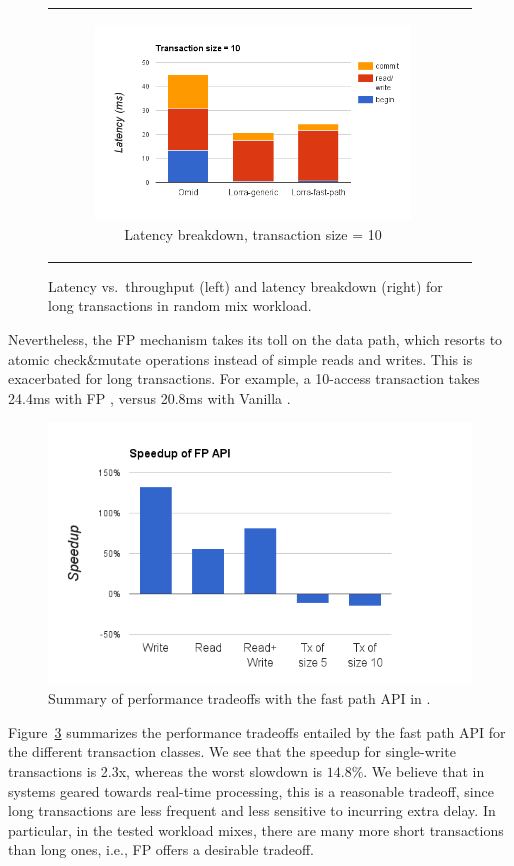 \begin{figure}[t]
\begin{tabular}{cc}
  \begin{subfigure}[t]{0.5\textwidth}
	\includegraphics[width=.9\textwidth]{figs/stack-tx10.png}
	\caption[]{Latency breakdown, transaction size = 10}
    \label{fig:stack-tx10}
  \end{subfigure} 
\end{tabular}  			
  \caption{Latency vs.\ throughput (left) and latency breakdown (right) for long transactions in random mix workload. }
  \label{fig:throughput-latency}
\end{figure}

Nevertheless,
the FP mechanism takes its toll on the data path, which resorts to atomic check\&mutate operations 
instead of simple reads and writes. This is exacerbated for long transactions. 
For example, a 10-access transaction takes 24.4ms with FP \sys, 
versus 20.8ms with Vanilla \sys. 

\begin{figure}[tbh]
\centering
\includegraphics[width=.4\textwidth]{figs/speedup.png}
\caption{Summary of performance tradeoffs with the fast path API in {\sys}.}
\label{fig:fp-tradeoff}
\end{figure}


Figure~\ref{fig:fp-tradeoff} summarizes the performance tradeoffs entailed by the fast path API
for the different transaction classes. 
We see that the speedup for single-write transactions is 2.3x, whereas the worst slowdown is $14.8\%$. 
We believe that in systems geared towards real-time processing, this is a reasonable tradeoff, since long transactions 
are less frequent and less sensitive to incurring extra delay.
In particular, in the tested workload mixes, there are many more short transactions than long ones, 
i.e., FP \sys\/ offers a desirable tradeoff. 
